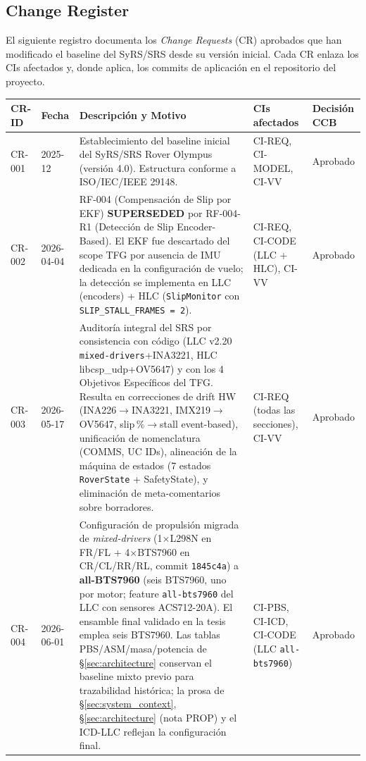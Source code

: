 \subsection{Change Register}\label{subsec:change-register}

El siguiente registro documenta los \emph{Change Requests} (CR) aprobados que han modificado el baseline del SyRS/SRS desde su versión inicial. Cada CR enlaza los CIs afectados y, donde aplica, los commits de aplicación en el repositorio del proyecto.

\begin{table}[H]
\centering
\small
\begin{tabularx}{\textwidth}{| l | l | X | l | l |}
\hline
\textbf{CR-ID} & \textbf{Fecha} & \textbf{Descripción y Motivo} & \textbf{CIs afectados} & \textbf{Decisión CCB} \\ \hline

CR-001 & 2025-12 &
Establecimiento del baseline inicial del SyRS/SRS Rover Olympus (versión 4.0). Estructura conforme a ISO/IEC/IEEE 29148. &
CI-REQ, CI-MODEL, CI-VV &
Aprobado \\ \hline

CR-002 & 2026-04-04 &
RF-004 (Compensación de Slip por EKF) \textbf{SUPERSEDED} por RF-004-R1 (Detección de Slip Encoder-Based). El EKF fue descartado del scope TFG por ausencia de IMU dedicada en la configuración de vuelo; la detección se implementa en LLC (encoders) + HLC (\texttt{SlipMonitor} con \texttt{SLIP\_STALL\_FRAMES = 2}). &
CI-REQ, CI-CODE (LLC + HLC), CI-VV &
Aprobado \\ \hline

CR-003 & 2026-05-17 &
Auditoría integral del SRS por consistencia con código (LLC v2.20 \texttt{mixed-drivers}+INA3221, HLC libcsp\_udp+OV5647) y con los 4 Objetivos Específicos del TFG. Resulta en correcciones de drift HW (INA226$\rightarrow$INA3221, IMX219$\rightarrow$OV5647, slip\,\%$\rightarrow$stall event-based), unificación de nomenclatura (COMMS, UC IDs), alineación de la máquina de estados (7 estados \texttt{RoverState} + SafetyState), y eliminación de meta-comentarios sobre borradores. &
CI-REQ (todas las secciones), CI-VV &
Aprobado \\ \hline

CR-004 & 2026-06-01 &
Configuración de propulsión migrada de \emph{mixed-drivers} (1$\times$L298N en FR/FL + 4$\times$BTS7960 en CR/CL/RR/RL, commit \texttt{1845c4a}) a \textbf{all-BTS7960} (seis BTS7960, uno por motor; feature \texttt{all-bts7960} del LLC con sensores ACS712-20A). El ensamble final validado en la tesis emplea seis BTS7960. Las tablas PBS/ASM/masa/potencia de \S\ref{sec:architecture} conservan el baseline mixto previo para trazabilidad histórica; la prosa de \S\ref{sec:system_context}, \S\ref{sec:architecture} (nota PROP) y el ICD-LLC reflejan la configuración final. &
CI-PBS, CI-ICD, CI-CODE (LLC \texttt{all-bts7960}) &
Aprobado \\ \hline


\end{tabularx}
\end{table}
